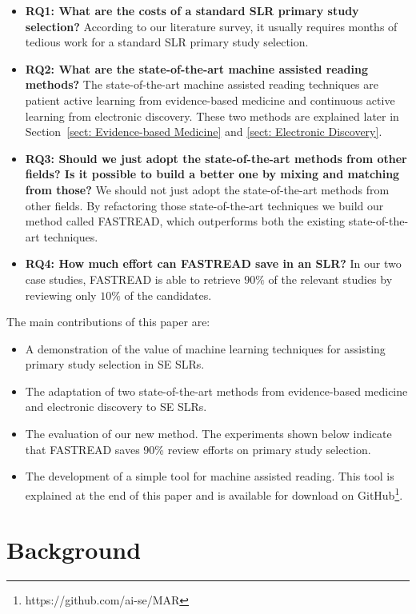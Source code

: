 \documentclass[final,twocolumn,5p]{elsarticle}
\theoremstyle{break}
\begin{document}
\begin{itemize}

\item
{\bf RQ1: What are the costs of a standard SLR primary study selection?} According to our literature survey, it usually requires months of tedious work for a standard SLR primary study selection.

\item
{\bf RQ2: What are the state-of-the-art machine assisted reading methods?} The
state-of-the-art machine assisted reading techniques are patient active learning
from evidence-based medicine and continuous active learning from electronic
discovery. These two methods are explained later in Section~\ref{sect: Evidence-based Medicine} and \ref{sect: Electronic Discovery}.

\item
{\bf RQ3: Should we just adopt the state-of-the-art methods from other fields? Is it possible to build a better one by mixing and matching from those?} We should not just adopt the state-of-the-art methods from other fields. By refactoring those state-of-the-art techniques we build our method called FASTREAD, which outperforms both the existing state-of-the-art techniques. 

\item
{\bf RQ4: How much effort can FASTREAD save in an SLR?} In our two case studies, FASTREAD is able to retrieve $90\%$ of the relevant studies by reviewing only $10\%$ of the candidates.


\end{itemize}
The main contributions of this paper are:
\begin{itemize}
\item
  A demonstration of the value of  machine learning techniques for assisting primary study selection in SE SLRs.
\item
  The adaptation of  two state-of-the-art methods
  from evidence-based medicine and electronic discovery to SE SLRs.
  
\item
  The evaluation of our new method.
  The experiments shown below indicate that FASTREAD
  saves 90\% review efforts on primary study selection.
\item The development of a simple tool for machine assisted reading.
  This tool is explained at the end of this paper and is
  available for download on GitHub\footnote{https://github.com/ai-se/MAR}. 
\end{itemize}
\section{Background}
\label{sect: Background}
\end{document}
